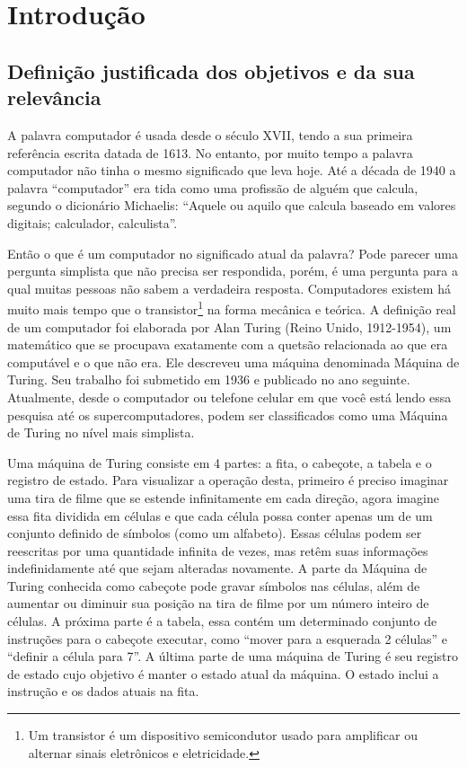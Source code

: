 \section{Introdução} 
\subsection{Definição justificada dos objetivos e da sua relevância}
A palavra computador é usada desde o século XVII, tendo a sua primeira referência escrita datada de 1613. No entanto, por muito tempo a palavra computador não tinha o mesmo significado que leva hoje. Até a década de 1940 a palavra “computador” era tida como uma profissão de alguém que calcula, segundo o dicionário Michaelis: “Aquele ou aquilo que calcula baseado em valores digitais; calculador, calculista”. \cite{4}

Então o que é um computador no significado atual da palavra? Pode parecer uma pergunta simplista que não precisa ser respondida, porém, é uma pergunta para a qual muitas pessoas não sabem a verdadeira resposta. Computadores existem há muito mais tempo que o transistor\footnote{Um transistor é um dispositivo semicondutor usado para amplificar ou alternar sinais eletrônicos e eletricidade.} na forma mecânica e teórica. A definição real de um computador foi elaborada por Alan Turing (Reino Unido, 1912-1954), um matemático que se procupava exatamente com a quetsão relacionada ao que era computável e o que não era. Ele descreveu uma máquina denominada Máquina de Turing. Seu trabalho foi submetido em 1936 e publicado no ano seguinte. Atualmente, desde o computador ou telefone celular em que você está lendo essa pesquisa até os supercomputadores, podem ser classificados como uma Máquina de Turing no nível mais simplista.

Uma máquina de Turing consiste em 4 partes: a fita, o cabeçote, a tabela e o registro de estado. Para visualizar a operação desta, primeiro é preciso imaginar uma tira de filme que se estende infinitamente em cada direção, agora imagine essa fita dividida em células e que cada célula possa conter apenas um de um conjunto definido de símbolos (como um alfabeto). Essas células podem ser reescritas por uma quantidade infinita de vezes, mas retêm suas informações indefinidamente até que sejam alteradas novamente. A parte da Máquina de Turing conhecida como cabeçote pode gravar símbolos nas células, além de aumentar ou diminuir sua posição na tira de filme por um número inteiro de células. A próxima parte é a tabela, essa contém um determinado conjunto de instruções para o cabeçote executar, como “mover para a esquerada 2 células” e “definir a célula para 7”. A última parte de uma máquina de Turing é seu registro de estado cujo objetivo é manter o estado atual da máquina. O estado inclui a instrução e os dados atuais na fita. \cite{2}

